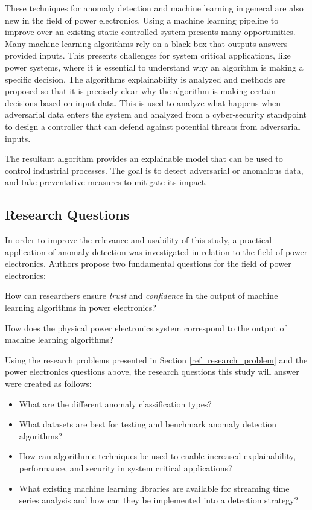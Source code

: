 These techniques for anomaly detection and machine learning in general are also new in the field of power electronics. Using a machine learning pipeline to improve over an existing static controlled system presents many opportunities. Many machine learning algorithms rely on a black box that outputs answers provided inputs. This presents challenges for system critical applications, like power systems, where it is essential to understand why an algorithm is making a specific decision. The algorithms explainability is analyzed and methods are proposed so that it is precisely clear why the algorithm is making certain decisions based on input data. This is used to analyze what happens when adversarial data enters the system and analyzed from a cyber-security standpoint to design a controller that can defend against potential threats from adversarial inputs.

The resultant algorithm provides an explainable model that can be used to control industrial processes. The goal is to detect adversarial or anomalous data, and take preventative measures to mitigate its impact.


\subsection{Research Questions}

In order to improve the relevance and usability of this study, a practical application of anomaly detection was investigated in relation to the field of power electronics.
Authors \cite{black-box-explainability} propose two fundamental questions for the field of power electronics:
\begin{inlinelist}
    \item How can researchers ensure \textit{trust} and \textit{confidence} in the output of machine learning algorithms in power electronics?
    \item How does the physical power electronics system correspond to the output of machine learning algorithms?
\end{inlinelist}

Using the research problems presented in Section \ref{ref_research_problem} and the power electronics questions above, the research questions this study will answer were created as follows:
\begin{itemize}
    \item What are the different anomaly classification types?
    \item What datasets are best for testing and benchmark anomaly detection algorithms?
    \item How can algorithmic techniques be used to enable increased explainability, performance, and security in system critical applications?
    \item What existing machine learning libraries are available for streaming time series analysis and how can they be implemented into a detection strategy?
\end{itemize}







